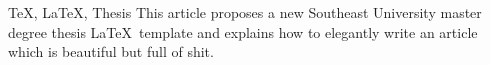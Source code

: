 \begin{abstract}{\TeX, \LaTeX, 学位论文}
本文提出了一个新的东南大学 \LaTeX 硕士研究生毕业论文模板，并说明了如何更优雅地写出一篇漂亮而无用的文章。
{\textbf{}}
{}

\end{abstract}

\begin{englishabstract}{\TeX, \LaTeX, Thesis}
This article proposes a new Southeast University master degree thesis \LaTeX ~template and explains how to elegantly write an article which is beautiful but full of shit.
\end{englishabstract}
